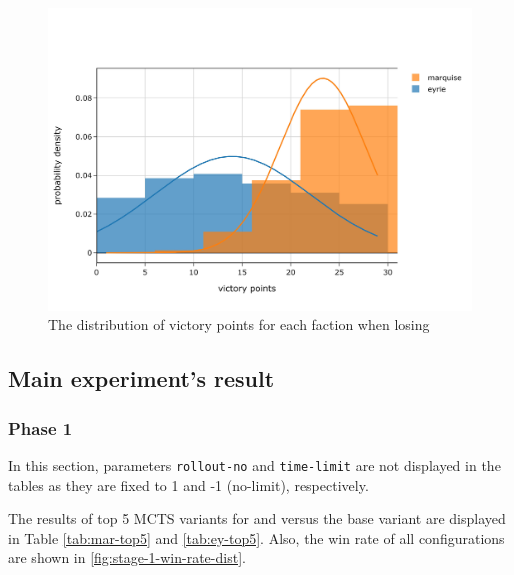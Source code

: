 \begin{figure}[h!]
    \begin{center}
      \includegraphics[width=\textwidth]{./images/fig-introductory-loser-vp-dist.jpeg}
    \end{center}
    \caption{The distribution of victory points for each faction when losing}
    \label{fig:introductory-loser-vp-dist}
\end{figure}

\subsection{Main experiment's result}

\subsubsection{Phase 1}


In this section, parameters \texttt{rollout-no} and \texttt{time-limit} are not displayed in the tables as they are fixed to 1 and -1 (no-limit), respectively.

The results of top 5 MCTS variants for \Marquise{} and \Eyrie{} versus the base variant are displayed in Table \ref{tab:mar-top5} and \ref{tab:ey-top5}. Also, the win rate of all configurations are shown in \ref{fig:stage-1-win-rate-dist}.

